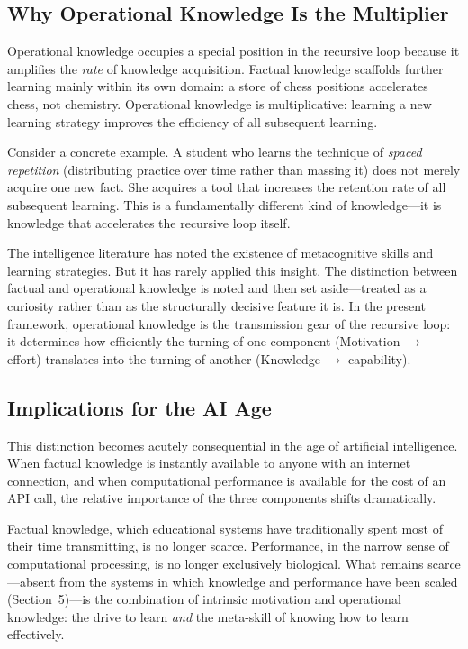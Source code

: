 \documentclass[12pt,a4paper]{article}
\begin{document}
\subsection{Why Operational Knowledge Is the Multiplier}

Operational knowledge occupies a special position in the recursive loop because it amplifies the \emph{rate} of knowledge acquisition. Factual knowledge scaffolds further learning mainly within its own domain: a store of chess positions accelerates chess, not chemistry. Operational knowledge is multiplicative: learning a new learning strategy improves the efficiency of all subsequent learning.

Consider a concrete example. A student who learns the technique of \emph{spaced repetition} (distributing practice over time rather than massing it) does not merely acquire one new fact. She acquires a tool that increases the retention rate of all subsequent learning. This is a fundamentally different kind of knowledge---\hspace{0pt}it is knowledge that accelerates the recursive loop itself.

The intelligence literature has noted the existence of metacognitive skills and learning strategies. But it has rarely applied this insight. The distinction between factual and operational knowledge is noted and then set aside---\hspace{0pt}treated as a curiosity rather than as the structurally decisive feature it is. In the present framework, operational knowledge is the transmission gear of the recursive loop: it determines how efficiently the turning of one component (Motivation $\rightarrow$ effort) translates into the turning of another (Knowledge $\rightarrow$ capability).

\subsection{Implications for the AI Age}

This distinction becomes acutely consequential in the age of artificial intelligence. When factual knowledge is instantly available to anyone with an internet connection, and when computational performance is available for the cost of an API call, the relative importance of the three components shifts dramatically.

Factual knowledge, which educational systems have traditionally spent most of their time transmitting, is no longer scarce. Performance, in the narrow sense of computational processing, is no longer exclusively biological. What remains scarce---\hspace{0pt}absent from the systems in which knowledge and performance have been scaled (Section~5)---\hspace{0pt}is the combination of intrinsic motivation and operational knowledge: the drive to learn \emph{and} the meta-skill of knowing how to learn effectively.
\end{document}
